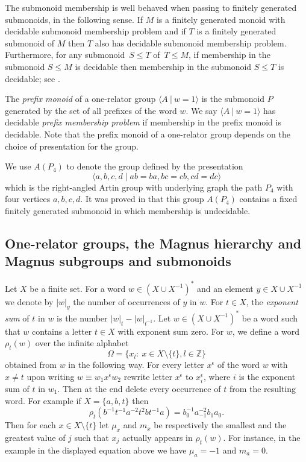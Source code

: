 \documentclass[11pt]{amsart}
\newcommand{\Gpres}[2]{\bigl\langle #1\:|\:#2 \bigr\rangle}
\theoremstyle{plain}
\theoremstyle{definition}
\begin{document}
The submonoid membership is well behaved when passing to finitely generated submonoids, in the following sense. If $M$ is a finitely generated monoid with decidable submonoid membership problem and if $T$ is a finitely generated submonoid of $M$ then $T$ also has decidable submonoid membership problem. Furthermore, for any submonoid~$S \leq T$ of~$T \leq M$, if membership in the submonoid $S \leq M$ is decidable then membership in the submonoid $S \leq T$ is decidable; see \cite[\S5]{lohrey2015rational}. 

The \emph{prefix monoid} of a one-relator group $\Gpres{A}{w=1}$ is the submonoid $P$ generated by the set of all prefixes of the word $w$. We say $\Gpres{A}{w=1}$ has decidable \emph{prefix membership problem} if membership in the prefix monoid is decidable. Note that the prefix monoid of a one-relator group depends on the choice of presentation for the group.        

We use $A(P_4)$ to denote the group defined by the presentation
\[
\langle a,b,c,d \mid ab=ba, bc=cb, cd=dc \rangle 
\]
which is the right-angled Artin group with underlying graph the path $P_4$ with four vertices $a,b,c,d$. It was proved in \cite[Theorem~7]{lohrey2008submonoid} that this group $A(P_4)$ contains a fixed finitely generated submonoid in which membership is undecidable.   





\subsection{One-relator groups, the Magnus hierarchy and Magnus subgroups and submonoids}

Let $X$ be a finite set.
For a word $w \in (X \cup X^{-1})^*$ and an element $y \in X \cup X^{-1}$ we denote by $|w|_{y}$ the number of occurrences of $y$ in $w$.
For $t \in X$, the \emph{exponent sum} of $t$ in $w$ is the number $|w|_t - |w|_{t^{-1}}$.
Let $w\in (X \cup X^{-1})^*$ be a word 
such that $w$ contains a letter 
$t \in X$ with exponent sum zero. For $w$, we define a word $\rho_t(w)$ over the infinite alphabet
$$\Omega = \{x_l:\ x\in X\setminus\{t\}, l\in\mathbb{Z}\}$$
obtained from $w$ in the following way. 
For every letter $x^{\epsilon}$ of the word $w$ with $x \neq t$ upon writing  
$w \equiv w_1 x^{\epsilon} w_2$ rewrite letter $x^{\epsilon}$ to $x_{i}^{\epsilon}$, where $i$ is the exponent sum of $t$ in $w_1$. Then at the end delete every occurrence of $t$ from the resulting word. 
For example if $X = \{a,b,t\}$ then  
\[
\rho_t(b^{-1}t^{-1} a^{-2} t^2 b t^{-1} a) = b_0^{-1} a_{-1}^{-2} b_{1} a_0. 
\]
Then for each  $x\in X\setminus\{t\}$ let $\mu_x$ and $m_x$ be respectively the smallest and the greatest value of $j$ such that  $x_j$ actually appears in $\rho_t(w)$.
For instance, in the example in the displayed equation above we have $\mu_a = -1$ and $m_a = 0$. 
\end{document}
